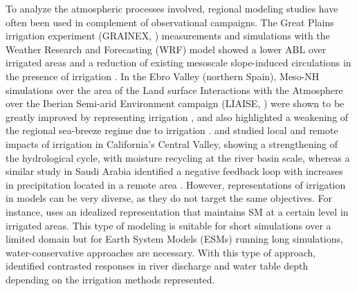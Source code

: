To analyze the atmospheric processes involved, regional modeling studies have often been used in complement of observational campaigns. The Great Plains irrigation experiment (GRAINEX, \cite{rappin_great_2021}) measurements and simulations with the Weather Research and Forecasting (WRF) model showed a lower ABL over irrigated areas and a reduction of existing mesoscale slope-induced circulations in the presence of irrigation \citep{rappin_landatmosphere_2022, phillips_influence_2022}. In the Ebro Valley (northern Spain), Meso-NH simulations over the area of the Land surface Interactions with the Atmosphere over the Iberian Semi-arid Environment campaign (LIAISE, \cite{boone_land_2019}) were shown to be greatly improved by representing irrigation \citep{lunel_irrigation_2024}, and also highlighted a weakening of the regional sea-breeze regime due to irrigation \citep{lunel_marinada_2024}.
\cite{lo_irrigation_2013} and \cite{yang_impact_2017} studied local and remote impacts of irrigation in California's Central Valley, showing a strengthening of the hydrological cycle, with moisture recycling at the river basin scale, whereas a similar study in Saudi Arabia identified a negative feedback loop with increases in precipitation located in a remote area \citep{lo_intense_2021}.
However, representations of irrigation in models can be very diverse, as they do not target the same objectives. For instance, \cite{lunel_irrigation_2024} uses an idealized representation that maintains SM at a certain level in irrigated areas. This type of modeling is suitable for short simulations over a limited domain but for Earth System Models (ESMs) running long simulations, water-conservative approaches are necessary. With this type of approach, \cite{leng_significant_2017} identified contrasted responses in river discharge and water table depth depending on the irrigation methods represented. 

